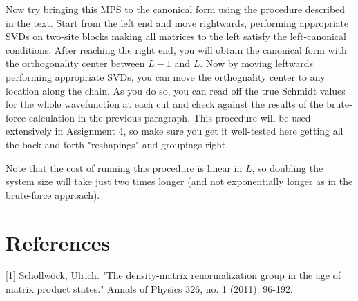 \documentclass[12pt]{article}
\begin{document}
\newpage
Now try bringing this MPS to the canonical form using the procedure described in the text. Start from the left end and move rightwards, performing appropriate SVDs on two-site blocks making all matrices to the left satisfy the left-canonical conditions. After reaching the right end, you will obtain the canonical form with the orthogonality center between $L-1$ and $L$. Now by moving leftwards performing appropriate SVDs, you can move the orthognality center to any location along the chain. As you do so, you can read off the true Schmidt values for the whole wavefunction at each cut and check against the results of the brute-force calculation in the previous paragraph. This procedure will be used extensively in Assignment 4, so make sure you get it well-tested here getting all the back-and-forth "reshapings" and groupings right.

Note that the cost of running this procedure is linear in $L$, so doubling the system size will take just two times longer (and not exponentially longer as in the brute-force approach).

\section*{References}
[1] Schollwöck, Ulrich. "The density-matrix renormalization group in the age of matrix product states." Annals of Physics 326, no. 1 (2011): 96-192.
\end{document}
